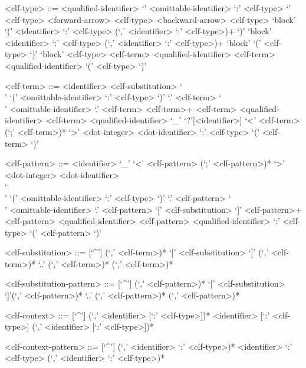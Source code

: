 \begin{grammar}
<clf-type> ::= <qualified-identifier>
\alt `{' <omittable-identifier> `:' <clf-type> `}' <clf-type>
 <forward-arrow> <clf-type>
 <backward-arrow> <clf-type>
\alt `block' `(' <identifier> `:' <clf-type> (`,' <identifier> `:' <clf-type>)+ `)'
\alt `block' <identifier> `:' <clf-type> (`,' <identifier> `:' <clf-type>)+
\alt `block' `(' <clf-type> `)'
\alt `block' <clf-type>
 <clf-term>
 <qualified-identifier> <clf-term>
 <qualified-identifier>
\alt `(' <clf-type> `)'

<clf-term> ::= <identifier>
 <clf-substitution>
\alt `\\' `(' <omittable-identifier> `:' <clf-type> `)' `.' <clf-term>
\alt `\\' <omittable-identifier> `.' <clf-term>
 <clf-term>+
 <clf-term>
 <qualified-identifier> <clf-term>
 <qualified-identifier>
\alt `_'
\alt `?'[<identifier>]
\alt `<' <clf-term> (`;' <clf-term>)* `>'
 <dot-integer>
 <dot-identifier>
 `:' <clf-type>
\alt `(' <clf-term> `)'

<clf-pattern> ::= <identifier>
\alt `_'
\alt `<' <clf-pattern> (`;' <clf-pattern>)* `>'
 <dot-integer>
 <dot-identifier>\\
\alt `\\' `(' <omittable-identifier> `:' <clf-type> `)' `.' <clf-pattern>
\alt `\\' <omittable-identifier> `.' <clf-pattern>
 `[' <clf-substitution> `]'
 <clf-pattern>+
 <clf-pattern>
 <qualified-identifier> <clf-pattern>
 <qualified-identifier>
 `:' <clf-type>
\alt `(' <clf-pattern> `)'

<clf-substitution> ::= [`^']
 (`,' <clf-term>)*
 `[' <clf-substitution> `]' (`,' <clf-term>)*
\alt `..' (`,' <clf-term>)*
 (`,' <clf-term>)*

<clf-substitution-pattern> ::= [`^']
 (`,' <clf-pattern>)*
 `[' <clf-substitution> `]'(`,' <clf-pattern>)*
\alt `..' (`,' <clf-pattern>)*
 (`,' <clf-pattern>)*

<clf-context> ::= [`^']
 (`,' <identifier> [`:' <clf-type>])*
\alt <identifier> [`:' <clf-type>] (`,' <identifier> [`:' <clf-type>])*

<clf-context-pattern> ::= [`^']
 (`,' <identifier> `:' <clf-type>)*
\alt <identifier> `:' <clf-type> (`,' <identifier> `:' <clf-type>)*
\end{grammar}

